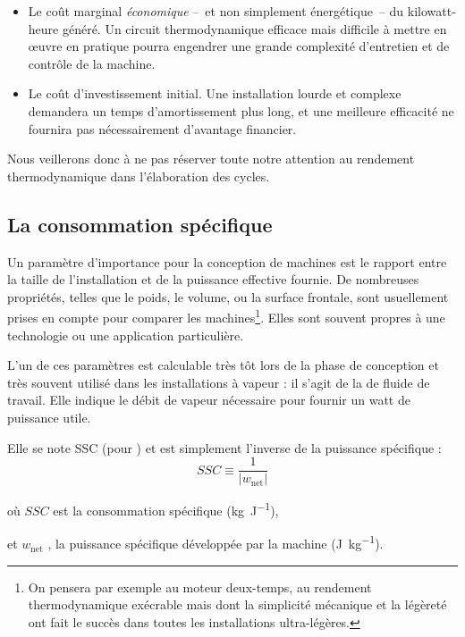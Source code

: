 		\begin{itemize}
			\item Le coût marginal \emph{économique} --\ et non simplement énergétique\ -- du kilowatt-heure généré. Un circuit thermodynamique efficace mais difficile à mettre en œuvre en pratique pourra engendrer une grande complexité d’entretien et de contrôle de la machine.
			\item Le coût d’investissement initial. Une installation lourde et complexe demandera un temps d’amortissement plus long, et une meilleure efficacité ne fournira pas nécessairement d’avantage financier.
		\end{itemize}

		Nous veillerons donc à ne pas réserver toute notre attention au rendement thermodynamique dans l’élaboration des cycles.



	\subsection{La consommation spécifique}
	\label{ch_SSC}

		Un paramètre d’importance pour la conception de machines est le rapport entre la taille de l’installation et de la puissance effective fournie. De nombreuses propriétés, telles que le poids, le volume, ou la surface frontale, sont usuellement prises en compte pour comparer les machines\footnote{On pensera par exemple au moteur deux-temps, au rendement thermodynamique exécrable mais dont la simplicité mécanique et la légèreté ont fait le succès dans toutes les installations ultra-légères.}.	Elles sont souvent propres à une technologie ou une application particulière.

		L’un de ces paramètres est calculable très tôt lors de la phase de conception et très souvent utilisé dans les installations à vapeur : il s’agit de la  de fluide de travail. Elle indique le débit de vapeur nécessaire pour fournir un watt de puissance utile.

		Elle se note SSC (pour ) et est simplement l’inverse de la puissance spécifique :
		\begin{equation}
			\mathit{SSC} \equiv  \frac{1}{|w_\text{net}|}
		\end{equation}

		\begin{equationterms}
			\item où \tab $SSC$ \tab est la consommation spécifique (\si{\kilogram\per\joule}),
			\item et \tab $w_\text{net}$ \tab, la puissance spécifique développée par la machine (\si{\joule\per\kilogram}).
		\end{equationterms}

